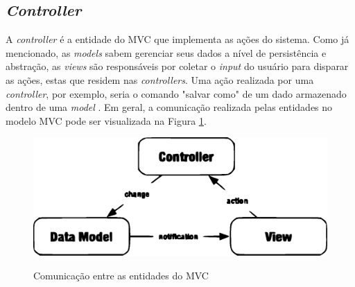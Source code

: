 \subsection{\textit{Controller}}

A \textit{controller} é a entidade do MVC que implementa as ações do sistema. Como já mencionado, as \textit{models} sabem gerenciar seus dados a nível de persistência e abstração, as \textit{views} são responsáveis por coletar o \textit{input} do usuário para disparar as ações, estas que residem nas \textit{controllers}. Uma ação realizada por uma \textit{controller}, por exemplo, seria o comando "salvar como" de um dado armazenado dentro de uma \textit{model} \cite{Bucanek2009}.
Em geral, a comunicação realizada pelas entidades no modelo MVC pode ser visualizada na Figura \ref{fig:diagrama_mvc}.  

\begin{figure}
    \centering
    \caption{Comunicação entre as entidades do MVC}
    \includegraphics[width=\textwidth]{figuras/diagrama_mvc.eps}
    \label{fig:diagrama_mvc}
\end{figure}